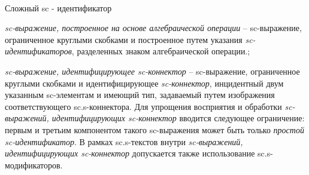 \begin{frame}{\\Сложный sc - идентификатор}
	\topline
	\justifying
	\vspace*{\fill}\\
	\scriptsize{
		\begin{textitemize}
			\item{\textit{sc-выражение, построенное на основе алгебраической операции} -- sc-выражение, ограниченное круглыми скобками и построенное путем указания \textit{sc-идентификаторов}, разделенных знаком алгебраической операции.};
			\item{\textit{sc-выражение, идентифицирующее sc-коннектор} -- sc-выражение, ограниченное круглыми скобками и идентифицирующее \textit{sc-коннектор}, инцидентный двум указанным sc-элементам и имеющий тип, задаваемый путем изображения соответствующего sc.s-коннектора.
				Для упрощения восприятия и обработки \textit{sc-выражений, идентифицирующих sc-коннектор} вводится следующее ограничение: первым и третьим компонентом такого sc-выражения может быть только \textit{простой sc-идентификатор}. В рамках sc.s-текстов внутри \textit{sc-выражений, идентифицирующих sc-коннектор} допускается также использование sc.s-модификаторов.}	
		\end{textitemize}	
	}
\end{frame}